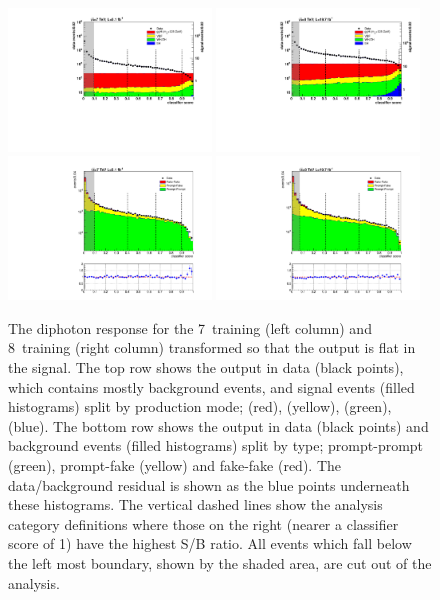 \begin{figure}
  \includegraphics[width=0.48\textwidth]{selec_and_cats/plots/mixedbdt_transformed_7TeV_fix.pdf} 
  \includegraphics[width=0.48\textwidth]{selec_and_cats/plots/mixedbdt_transformed_8TeV_fix.pdf} \\ 
  \includegraphics[width=0.48\textwidth]{selec_and_cats/plots/diphobdt_transformed_bg_7TeV_fix.pdf}
  \includegraphics[width=0.48\textwidth]{selec_and_cats/plots/diphobdt_transformed_bg_8TeV_fix.pdf}
  \caption[The diphoton \acs{BDT} response]{The diphoton \BDT response for the 7~\TeV training (left column) and 8~\TeV training (right column) transformed so that the output is flat in the signal. The top row shows the output in data (black points), which contains mostly background events, and signal \MC events (filled histograms) split by production mode; \ggH (red), \VBF (yellow), \VH (green), \ttH (blue). The bottom row shows the output in data (black points) and background \MC events (filled histograms) split by type; prompt-prompt (green), prompt-fake (yellow) and fake-fake (red). The data/background residual is shown as the blue points underneath these histograms. The vertical dashed lines show the analysis category definitions where those on the right (nearer a classifier score of 1) have the highest S/B ratio. All events which fall below the left most boundary, shown by the shaded area, are cut out of the analysis.}

\end{figure}
